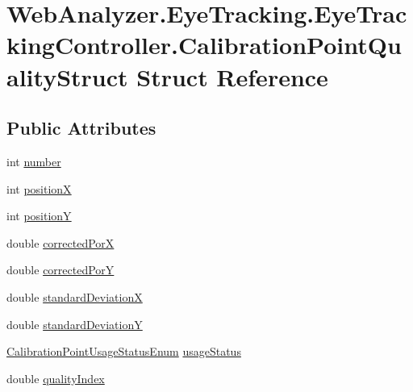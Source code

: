 \hypertarget{struct_web_analyzer_1_1_eye_tracking_1_1_eye_tracking_controller_1_1_calibration_point_quality_struct}{}\section{Web\+Analyzer.\+Eye\+Tracking.\+Eye\+Tracking\+Controller.\+Calibration\+Point\+Quality\+Struct Struct Reference}
\label{struct_web_analyzer_1_1_eye_tracking_1_1_eye_tracking_controller_1_1_calibration_point_quality_struct}
\subsection*{Public Attributes}
\begin{DoxyCompactItemize}
\item 
int \hyperlink{struct_web_analyzer_1_1_eye_tracking_1_1_eye_tracking_controller_1_1_calibration_point_quality_struct_abf4a7375e2857fcf6f5bd62cf2442c64}{number}
\item 
int \hyperlink{struct_web_analyzer_1_1_eye_tracking_1_1_eye_tracking_controller_1_1_calibration_point_quality_struct_ac3bdc7ddec67e1568ece624705ac5c34}{position\+X}
\item 
int \hyperlink{struct_web_analyzer_1_1_eye_tracking_1_1_eye_tracking_controller_1_1_calibration_point_quality_struct_ab6d31bc1f377fffec40454ac1f2386f6}{position\+Y}
\item 
double \hyperlink{struct_web_analyzer_1_1_eye_tracking_1_1_eye_tracking_controller_1_1_calibration_point_quality_struct_af580fa5dbc5ffe68c9e41b82696ccd0e}{corrected\+Por\+X}
\item 
double \hyperlink{struct_web_analyzer_1_1_eye_tracking_1_1_eye_tracking_controller_1_1_calibration_point_quality_struct_a10d715f74912324c6e6a62d17d325908}{corrected\+Por\+Y}
\item 
double \hyperlink{struct_web_analyzer_1_1_eye_tracking_1_1_eye_tracking_controller_1_1_calibration_point_quality_struct_a067964d3e939b4e041cb9291d8bd06c1}{standard\+Deviation\+X}
\item 
double \hyperlink{struct_web_analyzer_1_1_eye_tracking_1_1_eye_tracking_controller_1_1_calibration_point_quality_struct_adbbdae545c730e536f4d4181eb50ec80}{standard\+Deviation\+Y}
\item 
\hyperlink{class_web_analyzer_1_1_eye_tracking_1_1_eye_tracking_controller_a36f85c58685af035bb62a9d32eb6a832}{Calibration\+Point\+Usage\+Status\+Enum} \hyperlink{struct_web_analyzer_1_1_eye_tracking_1_1_eye_tracking_controller_1_1_calibration_point_quality_struct_a641387e14a3980cded3236d43e5b375d}{usage\+Status}
\item 
double \hyperlink{struct_web_analyzer_1_1_eye_tracking_1_1_eye_tracking_controller_1_1_calibration_point_quality_struct_ad5fb8a297e76f5ab91bac6891efbdece}{quality\+Index}
\end{DoxyCompactItemize}


